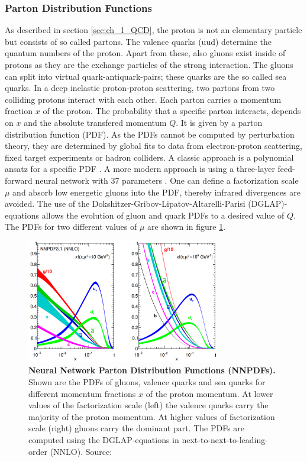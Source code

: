 \subsubsection*{Parton Distribution Functions}
As described in section \ref{sec:ch_1_QCD}, the proton is not an elementary particle but consists of so called partons. The valence quarks (uud) determine the quantum numbers of the proton. Apart from these, also gluons exist inside of protons as they are the exchange particles of the strong interaction. The gluons can split into virtual quark-antiquark-pairs; these quarks are the so called sea quarks. In a deep inelastic proton-proton scattering, two partons from two colliding protons interact with each other. Each parton carries a momentum fraction $x$ of the proton. The probability that a specific parton interacts, depends on $x$ and the absolute transfered momentum $Q$. It is given by a parton distribution function (PDF). As the PDFs cannot be computed by perturbation theory, they are determined by global fits to data from electron-proton scattering, fixed target experiments or hadron colliders. A classic approach is a polynomial ansatz for a specific PDF \cite{pdfOld}. A more modern approach is using a three-layer feed-forward neural network with 37 parameters \cite{nnpdf}. One can define a factorization scale $\mu$ and absorb low energetic gluons into the PDF, thereby infrared divergences are avoided. The use of the Dokshitzer-Gribov-Lipatov-Altarelli-Parisi (DGLAP)-equations \cite{DGLAP1,DGLAP2,DGLAP3} allows the evolution of gluon and quark PDFs to a desired value of $Q$. The PDFs for two different values of $\mu$ are shown in figure \ref{fig:ch_3_pdfs}.

\begin{figure}
\includegraphics[width=0.75\textwidth]{chapter_3_gen/nnpdfs.png}
\caption[Parton Distribution Functions]{\textbf{Neural Network Parton Distribution Functions (NNPDFs).} Shown are the PDFs of gluons, valence quarks and sea quarks for different momentum fractions $x$ of the proton momentum. At lower values of the factorization scale (left) the valence quarks carry the majority of the proton momentum. At higher values of factorization scale (right) gluons carry the dominant part. The PDFs are computed using the DGLAP-equations in next-to-next-to-leading-order (NNLO). Source: \cite{nnpdf}}
   \label{fig:ch_3_pdfs}
\end{figure}

